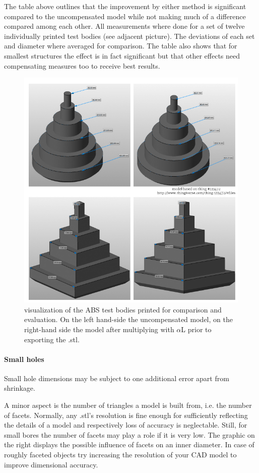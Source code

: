 The table above outlines that the improvement by either method is significant compared to the uncompensated model while not making much of a difference compared among each other.
All measurements where done for a set of twelve individually printed test bodies (see adjacent picture). The deviations of each set and diameter where averaged for comparison.
The table also shows that for smallest structures the effect is in fact significant but that other effects need compensating measures too to receive best results. 

\begin{figure}[H]
  \centering
  \includegraphics[width=.7\linewidth]{./img/pyrcompuncomp.png}
  \caption{visualization of the ABS test bodies printed for comparison and 
           evaluation. On the left hand-side the uncompensated model, on the right-hand side the model after multiplying with $\alpha$L prior to exporting the .stl.}
\end{figure}

\paragraph{Small holes}

Small hole dimensions may be subject to one additional error apart from shrinkage. 

A minor aspect is the number of triangles a model is built from, i.e. the number of facets. Normally, any .stl's resolution is fine enough for sufficiently reflecting the details of a model and respectively loss of accuracy is neglectable.
Still, for small bores the number of facets may play a role if it is very low.
The graphic on the right displays the possible influence of facets on an inner diameter.
In case of roughly faceted objects try increasing the resolution of your CAD model to improve dimensional accuracy. 



